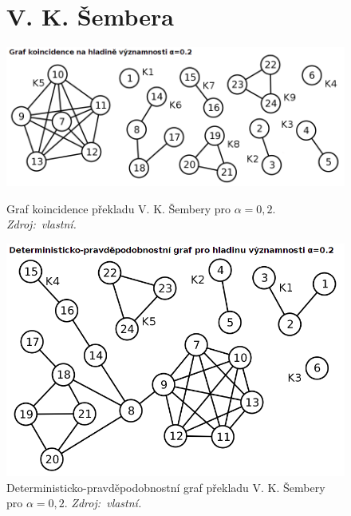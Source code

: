 \documentclass[dp.tex]{subfiles}
\begin{document}
\begin{figure}[h]
\section*{V. K. Šembera}
	\centering
	\includegraphics[max width=\textwidth,keepaspectratio=true]{imgs-99-priloha-d/a_k_20}
	\caption[Graf koincidence překladu V. K. Šembery pro $\alpha = 0{,}2$]{Graf koincidence překladu V. K. Šembery pro $\alpha = 0{,}2$. \textit{Zdroj:~vlastní.}}
	\label{fig:a_k_20}

	\includegraphics[max width=\textwidth,keepaspectratio=true]{imgs-99-priloha-d/a_d_20}
	\caption[Deterministicko-pravděpodobnostní graf překladu V. K. Šembery pro $\alpha = 0{,}2$]{Deterministicko-pravděpodobnostní graf překladu V. K. Šembery pro $\alpha = 0{,}2$. \textit{Zdroj:~vlastní.}}
	\label{fig:a_d_20}
\end{figure}
\end{document}
